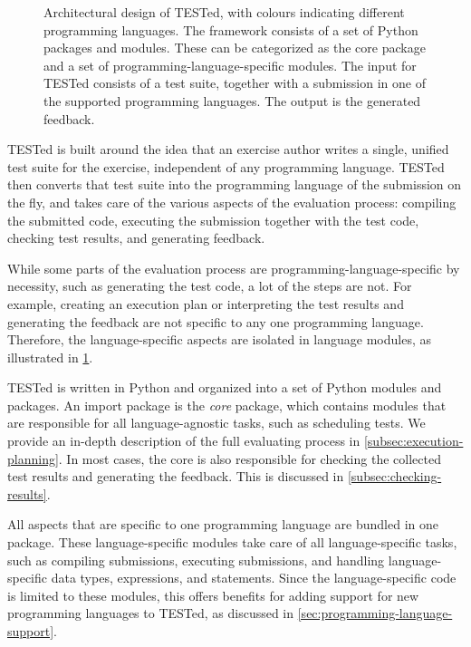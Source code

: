 \documentclass[../main]{subfiles}
\begin{document}
\begin{figure}
    \centering
    
    \caption{
        Architectural design of TESTed, with colours indicating different programming languages.
        The framework consists of a set of Python packages and modules.
        These can be categorized as the core package and a set of programming-language-specific modules.
        The input for TESTed consists of a test suite, together with a submission in one of the supported programming languages.
        The output is the generated feedback.
    }
    \label{fig:conceptual-design}
\end{figure}

TESTed is built around the idea that an exercise author writes a single, unified test suite for the exercise, independent of any programming language.
TESTed then converts that test suite into the programming language of the submission on the fly, and takes care of the various aspects of the evaluation process: compiling the submitted code, executing the submission together with the test code, checking test results, and generating feedback.

While some parts of the evaluation process are programming-language-specific by necessity, such as generating the test code, a lot of the steps are not.
For example, creating an execution plan or interpreting the test results and generating the feedback are not specific to any one programming language.
Therefore, the language-specific aspects are isolated in language modules, as illustrated in \cref{fig:conceptual-design}.

\leavevmode{}%
TESTed is written in Python and organized into a set of Python modules and packages.
An import package is the \emph{core} package, which contains modules that are responsible for all language-agnostic tasks, such as scheduling tests.
We provide an in-depth description of the full evaluating process in \cref{subsec:execution-planning}.
In most cases, the core is also responsible for checking the collected test results and generating the feedback.
This is discussed in \cref{subsec:checking-results}.

All aspects that are specific to one programming language are bundled in one package.
These language-specific modules take care of all language-specific tasks, such as compiling submissions, executing submissions, and handling language-specific data types, expressions, and statements.
Since the language-specific code is limited to these modules, this offers benefits for adding support for new programming languages to TESTed, as discussed in \cref{sec:programming-language-support}.
\end{document}
